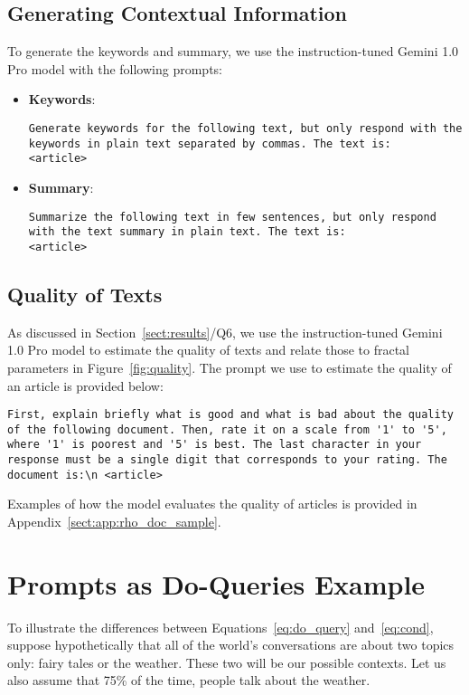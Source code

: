 \subsection{Generating Contextual Information}
To generate the keywords and summary, we use the instruction-tuned Gemini 1.0 Pro model with the following prompts: 
\begin{itemize}
    \item \textbf{Keywords}: 
    \begin{lstlisting}
Generate keywords for the following text, but only respond with the keywords in plain text separated by commas. The text is: 
<article>
    \end{lstlisting}
    \item \textbf{Summary}: 
    \begin{lstlisting}
Summarize the following text in few sentences, but only respond with the text summary in plain text. The text is: 
<article>
    \end{lstlisting}
\end{itemize}


\subsection{Quality of Texts}
As discussed in Section~\ref{sect:results}/Q6, we use the instruction-tuned Gemini 1.0 Pro model to estimate the quality of texts and relate those to fractal parameters in Figure~\ref{fig:quality}. The prompt we use to estimate the quality of an article is provided below:

\begin{lstlisting}
First, explain briefly what is good and what is bad about the quality of the following document. Then, rate it on a scale from '1' to '5', where '1' is poorest and '5' is best. The last character in your response must be a single digit that corresponds to your rating. The document is:\n <article>
\end{lstlisting}

Examples of how the model evaluates the quality of articles is provided in Appendix~\ref{sect:app:rho_doc_sample}.


\newpage
\section{Prompts as Do-Queries Example}\label{sect:app:doquery_example}
To illustrate the differences between Equations~\ref{eq:do_query} and~\ref{eq:cond}, suppose hypothetically that all of the world's conversations are about two topics only: fairy tales or the weather. These two will be our possible contexts. Let us also assume that 75\% of the time, people talk about the weather. 

